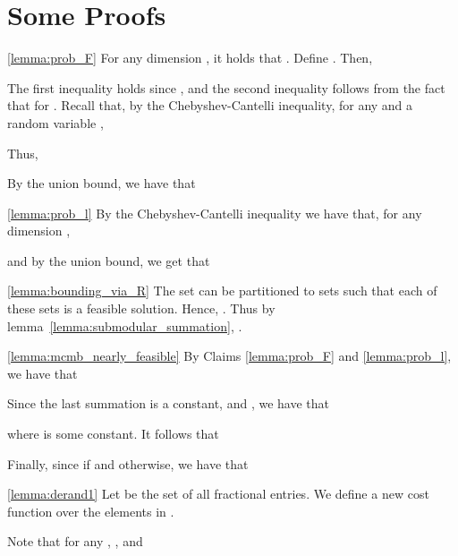 \documentclass[11pt]{article}
\newenvironment{dl_proof}[1]{\noindent{\bf Proof of Lemma #1:}}{
 \hspace*{\fill}  \vskip \belowdisplayskip}
\newenvironment{dl_claim_proof}[1]{\noindent{\bf Proof of Claim #1:}}{
 \hspace*{\fill}  \vskip \belowdisplayskip}
\begin{document}
{\section{Some Proofs}
\label{app:proofs}


\begin{dl_claim_proof}{\ref{lemma:prob_F}}
For any dimension ,
it holds that .
Define . Then,

The first inequality holds since , and the second
inequality follows from the fact that  for
.
Recall that, by the Chebyshev-Cantelli inequality, for any  and a random
variable ,

Thus,

By the union bound, we have that

\end{dl_claim_proof}




\begin{dl_claim_proof}{\ref{lemma:prob_l}}
By the Chebyshev-Cantelli inequality we have that, for any dimension
,

and by the union bound, we get that

\end{dl_claim_proof}

\begin{dl_claim_proof}{\ref{lemma:bounding_via_R}}
The set  can be partitioned to  sets
 such that each of these
sets is a feasible solution. Hence, .
Thus by lemma~\ref{lemma:submodular_summation}, .
\end{dl_claim_proof}



\begin{dl_claim_proof}{\ref{lemma:mcmb_nearly_feasible}}
By Claims \ref{lemma:prob_F} and \ref{lemma:prob_l}, we have that

Since the last summation is a constant, and , we have that
 
where  is some constant. It follows that
 
Finally, since  if  and  otherwise, we have that

 \end{dl_claim_proof}



\begin{dl_proof}{\ref{lemma:derand1}}
Let  be the set of all fractional entries.
We define a new cost function  over the elements in .



Note that for any , , and


\end{dl_proof}}
\end{document}
